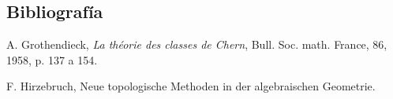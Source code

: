 \subsection*{Bibliografía}
\begin{enumerate}[label={[\arabic*]}]
\item A. Grothendieck, \emph{La théorie des classes de Chern}, Bull. Soc. math. France, 86, 1958, p. 137 a 154.
\item F. Hirzebruch, Neue topologische Methoden in der algebraischen Geometrie.
\end{enumerate}



\providecommand{\Sym}{\operatorname{Sym}}
\providecommand{\Proj}{\operatorname{Proj}}
\providecommand{\Projz}{\operatorname{Proj}_0}
\providecommand{\Spec}{\operatorname{Spec}}
\providecommand{\Comp}{\operatorname{Comp}}
\providecommand{\Dplus}{D_{+}}
\providecommand{\id}{\operatorname{id}}
\providecommand{\cG}{\mathcal G}
\providecommand{\cA}{\mathcal A}
\providecommand{\cB}{\mathcal B}
\providecommand{\cL}{\mathscr L}
\providecommand{\cM}{\mathscr M}
\providecommand{\cN}{\mathscr N}
\providecommand{\cE}{\mathscr E}
\providecommand{\cK}{\mathscr K}
\providecommand{\cP}{\mathscr P}
\providecommand{\cQ}{\mathscr Q}
\providecommand{\OO}{\mathcal O}
\providecommand{\rk}{\operatorname{rk}}
\providecommand{\colim}{\operatorname*{colim}}


